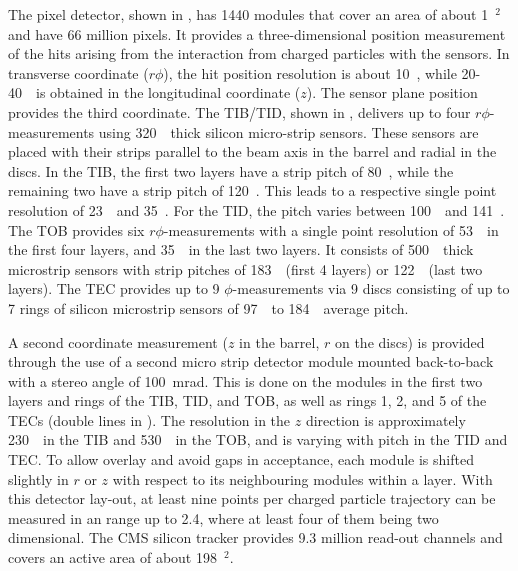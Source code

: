  The pixel detector, shown in , has 1440 modules that cover an area of about 1~\meter$^2$ and have 66 million pixels. It provides a three-dimensional position measurement of the hits arising from the interaction from charged particles with the sensors. In transverse coordinate ($r\phi$), the hit position resolution is about 10~\micro \meter, while 20-40~\micro \meter\ is obtained in the longitudinal coordinate ($z$). The sensor plane position provides the third coordinate. 
 The TIB/TID, shown in , delivers up to four $r\phi$-measurements using  320~\micro\meter\ thick silicon micro-strip sensors. These sensors are placed with their strips parallel to the beam axis in the barrel and radial in the discs. In the TIB, the first two layers have a strip pitch of 80~\micro \meter, while the remaining two have a strip pitch of 120~\micro\meter. This leads to a respective single point resolution of 23~\micro\meter\ and 35~\micro\meter. For the TID, the pitch varies between 100~\micro\meter\ and 141~\micro\meter. 
 The TOB provides six $r\phi$-measurements with a single point resolution of 53~\micro\meter\ in the first four layers, and 35~\micro \meter\ in the last two layers. It consists of 500~\micro\meter\ thick microstrip sensors with strip pitches of 183~\micro\meter\ (first 4 layers) or 122~\micro\meter\ (last two layers). The TEC provides up to 9 $\phi$-measurements via 9 discs consisting of up to 7 rings of silicon microstrip sensors of 97~\micro\meter\ to 184~\micro\meter\ average pitch.
 
 A second coordinate measurement ($z$ in the barrel, $r$ on the discs) is provided through the use of a second micro strip detector module mounted back-to-back with a stereo angle of 100~mrad. This is done on the modules in the first two layers and rings of the TIB, TID, and TOB, as well as rings 1, 2, and 5 of the TECs (double lines in ). The resolution in the  $z$ direction is approximately 230~\micro \meter\ in the TIB and 530~\micro \meter\ in the TOB, and is varying with pitch in the TID and TEC.  To allow overlay and avoid gaps in acceptance, each module is shifted slightly in $r$ or $z$ with respect to its neighbouring modules within a layer.  With this detector lay-out, at least nine points per charged particle trajectory can be measured in an \abspsrap range up to 2.4, where at least four of them being two dimensional.
 The CMS silicon tracker provides 9.3 million read-out channels and covers an active area of about 198~\meter$^2$.  
  
